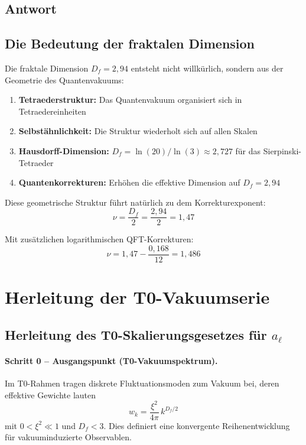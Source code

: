 \documentclass[12pt,a4paper]{article}
\newcommand{\nulep}{\nu}
\theoremstyle{remark}
\newenvironment{answer}{\subsection*{Antwort}}{\vspace{1em}}
\begin{document}
\begin{answer}
	\subsection{Die Bedeutung der fraktalen Dimension}
	
	Die fraktale Dimension $D_f = 2{,}94$ entsteht nicht willkürlich, sondern aus der Geometrie des Quantenvakuums:
	\begin{enumerate}
		\item \textbf{Tetraederstruktur:} Das Quantenvakuum organisiert sich in Tetraedereinheiten
		\item \textbf{Selbstähnlichkeit:} Die Struktur wiederholt sich auf allen Skalen
		\item \textbf{Hausdorff-Dimension:} $D_f = \ln(20)/\ln(3) \approx 2{,}727$ für das Sierpinski-Tetraeder
		\item \textbf{Quantenkorrekturen:} Erhöhen die effektive Dimension auf $D_f = 2{,}94$
	\end{enumerate}
	
	Diese geometrische Struktur führt natürlich zu dem Korrekturexponent:
	\begin{equation}
		\nulep = \frac{D_f}{2} = \frac{2{,}94}{2} = 1{,}47
	\end{equation}
	
	Mit zusätzlichen logarithmischen QFT-Korrekturen:
	\begin{equation}
		\nulep = 1{,}47 - \frac{0{,}168}{12} = 1{,}486
	\end{equation}
\end{answer}

\section{Herleitung der T0-Vakuumserie}

\subsection{Herleitung des T0-Skalierungsgesetzes für $a_\ell$}

\paragraph{Schritt 0 -- Ausgangspunkt (T0-Vakuumspektrum).}
Im T0-Rahmen tragen diskrete Fluktuationsmoden zum Vakuum bei, deren effektive Gewichte lauten
\begin{equation}
	w_k = \frac{\xi^2}{4\pi}\,k^{D_f/2}
\end{equation}
mit $0<\xi^2\ll 1$ und $D_f<3$. Dies definiert eine konvergente Reihenentwicklung für vakuuminduzierte Observablen.
\end{document}
